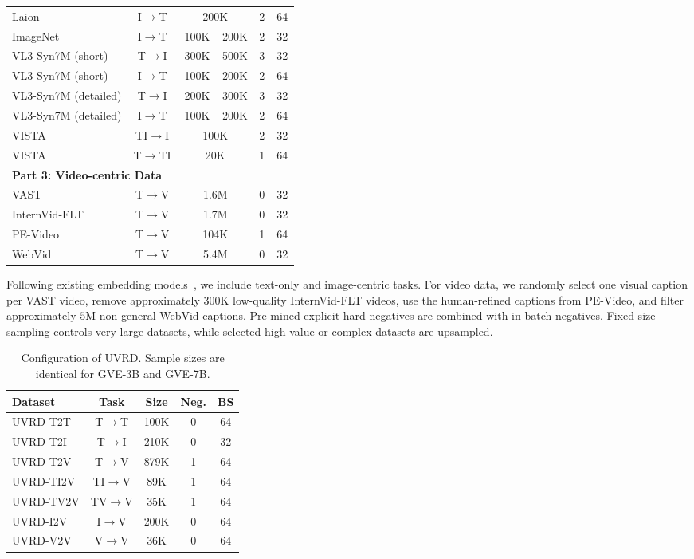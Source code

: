 \begin{table}[!t]
\begin{tabular}{@{}p{0.42\linewidth}crrcc@{}}
Laion & I$\to$T & \multicolumn{2}{c}{200K} & 2 & 64 \\
ImageNet & I$\to$T & 100K & 200K & 2 & 32 \\
VL3-Syn7M (short) & T$\to$I & 300K & 500K & 3 & 32 \\
VL3-Syn7M (short) & I$\to$T & 100K & 200K & 2 & 64 \\
VL3-Syn7M (detailed) & T$\to$I & 200K & 300K & 3 & 32 \\
VL3-Syn7M (detailed) & I$\to$T & 100K & 200K & 2 & 64 \\
VISTA & TI$\to$I & \multicolumn{2}{c}{100K} & 2 & 32 \\
VISTA & T$\to$TI & \multicolumn{2}{c}{20K} & 1 & 64 \\
\midrule
\multicolumn{6}{l}{\textbf{Part 3: Video-centric Data}} \\
VAST & T$\to$V & \multicolumn{2}{c}{1.6M} & 0 & 32 \\
InternVid-FLT & T$\to$V & \multicolumn{2}{c}{1.7M} & 0 & 32 \\
PE-Video & T$\to$V & \multicolumn{2}{c}{104K} & 1 & 64 \\
WebVid & T$\to$V & \multicolumn{2}{c}{5.4M} & 0 & 32 \\
\bottomrule
\end{tabular}
\end{table}

Following existing embedding models~\cite{li2023towards,Zhang_2025_CVPR}, we include text-only and image-centric tasks. For video data, we randomly select one visual caption per VAST video, remove approximately $300$K low-quality InternVid-FLT videos, use the human-refined captions from PE-Video, and filter approximately $5$M non-general WebVid captions. Pre-mined explicit hard negatives are combined with in-batch negatives. Fixed-size sampling controls very large datasets, while selected high-value or complex datasets are upsampled.

\begin{table}[t]
\centering
\caption{Configuration of UVRD. Sample sizes are identical for GVE-3B and GVE-7B.}
\label{gve:tab:uvrd_data}
\begin{tabular}{l c c c c}
\toprule
\textbf{Dataset} & \textbf{Task} & \textbf{Size} & \textbf{Neg.} & \textbf{BS} \\
\midrule
UVRD-T2T & T$\to$T & 100K & 0 & 64 \\
UVRD-T2I & T$\to$I & 210K & 0 & 32 \\
UVRD-T2V & T$\to$V & 879K & 1 & 64 \\
UVRD-TI2V & TI$\to$V & 89K & 1 & 64 \\
UVRD-TV2V & TV$\to$V & 35K & 1 & 64 \\
UVRD-I2V & I$\to$V & 200K & 0 & 64 \\
UVRD-V2V & V$\to$V & 36K & 0 & 64 \\
\bottomrule
\end{tabular}
\end{table}

